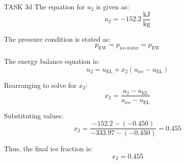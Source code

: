 TASK 3d  
The equation for \( u_2 \) is given as:  
\[
u_2 = -152.2 \, \frac{\text{kJ}}{\text{kg}}
\]  

The pressure condition is stated as:  
\[
p_{\text{EW}} = p_{\text{ice-water}} = p_{\text{EW}}
\]  

The energy balance equation is:  
\[
u_2 = u_{\text{EL}} + x_2 (u_{\text{ice}} - u_{\text{EL}})
\]  

Rearranging to solve for \( x_2 \):  
\[
x_2 = \frac{u_2 - u_{\text{EL}}}{u_{\text{ice}} - u_{\text{EL}}}
\]  

Substituting values:  
\[
x_2 = \frac{-152.2 - (-0.450)}{-333.97 - (-0.450)} = 0.455
\]  

Thus, the final ice fraction is:  
\[
x_2 = 0.455
\]